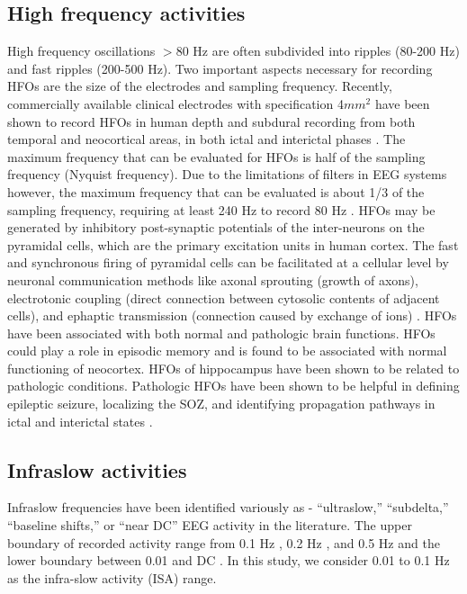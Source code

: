 \subsection{High frequency activities}
High frequency oscillations $> 80$ Hz are often subdivided into ripples (80-200 Hz) and fast ripples (200-500 Hz). Two important aspects necessary for recording HFOs are the size of the electrodes and sampling frequency. Recently, commercially available clinical electrodes with specification 4$mm^2$ have been shown to record HFOs in human depth and subdural recording from both temporal and neocortical areas, in both ictal and interictal phases \citep{ochi2007dynamic, worrell2008high, crepon2010mapping, wu2010removing}. The maximum frequency that can be evaluated for HFOs is half of the sampling frequency (Nyquist frequency). Due to the limitations of filters in EEG systems however, the maximum frequency that can be evaluated is about 1/3 of the sampling frequency, requiring at least 240 Hz to record 80 Hz \citep{modur2014high}. HFOs may be generated by inhibitory post-synaptic potentials of the inter-neurons on the pyramidal cells, which are the primary excitation units in human cortex. The fast and synchronous firing of pyramidal cells can be facilitated at a cellular level by neuronal communication methods like axonal sprouting (growth of axons), electrotonic coupling (direct connection between cytosolic contents of adjacent cells), and ephaptic transmission (connection caused by exchange of ions) \citep{jiruska2010electrographic}. HFOs have been associated with both normal and pathologic brain functions. HFOs could play a role in episodic memory and is found to be associated with normal functioning of neocortex. HFOs of hippocampus have been shown to be related to pathologic conditions. Pathologic HFOs have been shown to be helpful in defining epileptic seizure, localizing the SOZ, and identifying propagation pathways in ictal and interictal states \citep{zijlmans2011ictal}. 

\subsection{Infraslow activities}
Infraslow frequencies have been identified variously as - “ultraslow,” “subdelta,” “baseline shifts,” or “near DC” EEG activity in the literature. The upper boundary of recorded activity range from 0.1 Hz \citep{miller2007ictal}, 0.2 Hz \citep{modur2012seizure}, and 0.5 Hz \citep{murai2020scalp} and the lower boundary between 0.01 and DC \citep{kim2009ictal}. In this study, we consider 0.01 to 0.1 Hz as the infra-slow activity (ISA) range. 

